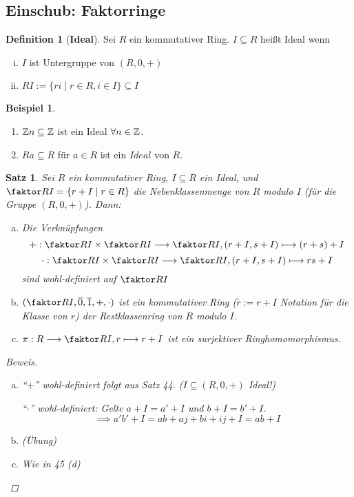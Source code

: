 \documentclass[a4paper]{article}
\theoremstyle{plain}
\newtheorem{satz}[thm]{Satz}
\theoremstyle{definition}
\newtheorem{defi}[thm]{Definition}
\newtheorem*{bsp*}{Beispiel}
\begin{document}
\subsection*{Einschub: Faktorringe}
\begin{defi}[\textbf{Ideal}]
  Sei $R$ ein kommutativer Ring. $I \subseteq R$ heißt Ideal wenn
  \begin{enumerate}[(i)]
    \item $I$ ist Untergruppe von $(R, 0, +)$
    \item $RI := \{ri \mid r \in R, i \in I\} \subseteq I$
  \end{enumerate}
\end{defi}
\begin{bsp*}
  \begin{enumerate}[1)]
    \item $\Bbb Zn \subseteq \Bbb Z$ ist ein Ideal $\forall n \in \Bbb Z$.
    \item $Ra \subseteq R$ für $a \in R$ ist ein $Ideal$ von $R$.
  \end{enumerate}
\end{bsp*}

\begin{satz}
  Sei $R$ ein kommutativer Ring, $I \subseteq R$ ein Ideal, und $\faktor RI = \{r + I \mid r \in R\}$ die Nebenklassenmenge von $R$ modulo $I$ (für die Gruppe $(R, 0, +)$). Dann:
  \begin{enumerate}[(a)]
    \item Die Verknüpfungen $$+ : \faktor RI \times \faktor RI \longrightarrow \faktor RI, (r+I, s+I) \longmapsto (r+s)+I$$
          $$\cdot : \faktor RI \times \faktor RI \longrightarrow \faktor RI, (r+I, s+I) \longmapsto rs+I$$
          sind wohl-definiert auf $\faktor RI$

    \item $(\faktor RI, \overline 0, \overline 1, +, \cdot)$ ist ein kommutativer Ring ($\overline r := r + I$ Notation für die Klasse von $r$) der Restklassenring von $R$ modulo $I$.
    \item $\pi : R \longrightarrow \faktor RI, r \longmapsto r+I$ ist ein surjektiver Ringhomomorphismus.
  \end{enumerate}
\begin{proof}[Beweis]
\begin{enumerate}[(a)]
  \item ``$+$'' wohl-definiert folgt aus Satz 44. ($I \subseteq (R, 0, +)$ Ideal!)

        ``$\cdot$''  wohl-definiert: Gelte $a+I = a'+I$ und $b+I = b'+I$.
        $$\implies a'b' + I = ab + aj + bi + ij + I = ab + I$$
  \item (Übung)
  \item Wie in 45 (d)
\end{enumerate}
\end{proof}
\end{satz}
\end{document}
